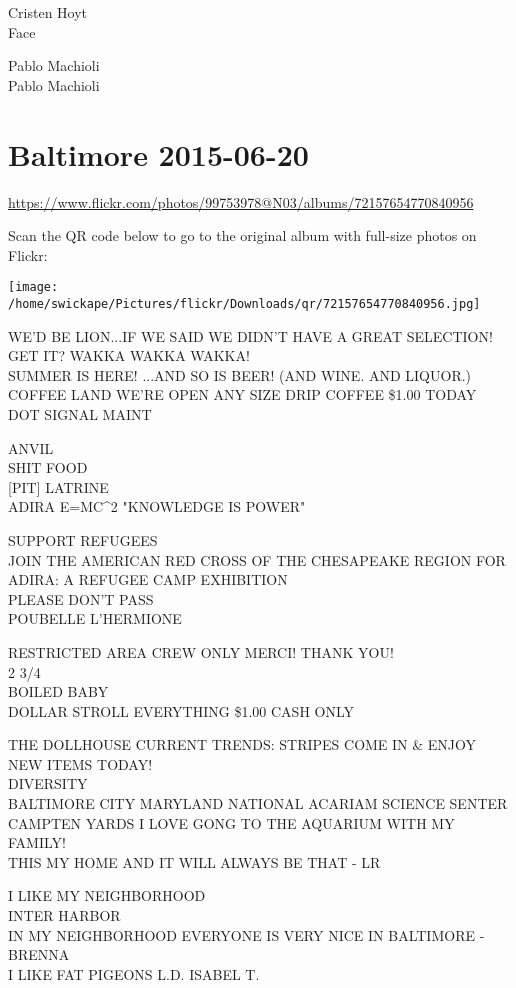\documentclass[10pt,letterpaper]{article}
\begin{document}
Cristen Hoyt\\
Face

Pablo Machioli\\
Pablo Machioli
\pagebreak

\section*{Baltimore 2015-06-20}

\url{https://www.flickr.com/photos/99753978@N03/albums/72157654770840956}

Scan the QR code below to go to the original album with full-size photos on Flickr:

\texttt{[image: /home/swickape/Pictures/flickr/Downloads/qr/72157654770840956.jpg]}
\pagebreak

WE'D BE LION...IF WE SAID WE DIDN'T HAVE A GREAT SELECTION!  GET IT?  WAKKA WAKKA WAKKA!\\
SUMMER IS HERE!  ...AND SO IS BEER!  (AND WINE.  AND LIQUOR.)\\
COFFEE LAND WE'RE OPEN ANY SIZE DRIP COFFEE \$1.00 TODAY\\
DOT SIGNAL MAINT

ANVIL\\
SHIT FOOD\\
{[}PIT{]} LATRINE\\
ADIRA E=MC\^{}2 "KNOWLEDGE IS POWER"

SUPPORT REFUGEES\\
JOIN THE AMERICAN RED CROSS OF THE CHESAPEAKE REGION FOR ADIRA: A REFUGEE CAMP EXHIBITION\\
PLEASE DON'T PASS\\
POUBELLE L'HERMIONE

RESTRICTED AREA CREW ONLY MERCI!  THANK YOU!\\
2 3/4\\
BOILED BABY\\
DOLLAR STROLL EVERYTHING \$1.00 CASH ONLY

THE DOLLHOUSE CURRENT TRENDS: STRIPES COME IN \& ENJOY NEW ITEMS TODAY!\\
DIVERSITY\\
BALTIMORE CITY MARYLAND NATIONAL ACARIAM SCIENCE SENTER CAMPTEN YARDS I LOVE GONG TO THE AQUARIUM WITH MY FAMILY!\\
THIS MY HOME AND IT WILL ALWAYS BE THAT {-} LR

I LIKE MY NEIGHBORHOOD\\
INTER HARBOR\\
IN MY NEIGHBORHOOD EVERYONE IS VERY NICE IN BALTIMORE {-} BRENNA\\
I LIKE FAT PIGEONS L.D. ISABEL T.
\end{document}
